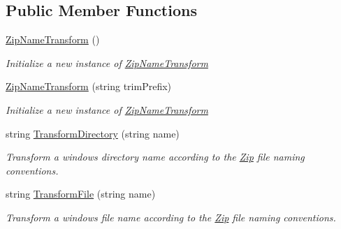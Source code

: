 \subsection*{Public Member Functions}
\begin{DoxyCompactItemize}
\item 
\hyperlink{class_i_c_sharp_code_1_1_sharp_zip_lib_1_1_zip_1_1_zip_name_transform_afa0dd0f6d624a02f5921112095c54349}{Zip\+Name\+Transform} ()
\begin{DoxyCompactList}\small\item\em Initialize a new instance of \hyperlink{class_i_c_sharp_code_1_1_sharp_zip_lib_1_1_zip_1_1_zip_name_transform}{Zip\+Name\+Transform} \end{DoxyCompactList}\item 
\hyperlink{class_i_c_sharp_code_1_1_sharp_zip_lib_1_1_zip_1_1_zip_name_transform_a31a8cb86bd117d63534efbad7a79b0f3}{Zip\+Name\+Transform} (string trim\+Prefix)
\begin{DoxyCompactList}\small\item\em Initialize a new instance of \hyperlink{class_i_c_sharp_code_1_1_sharp_zip_lib_1_1_zip_1_1_zip_name_transform}{Zip\+Name\+Transform} \end{DoxyCompactList}\item 
string \hyperlink{class_i_c_sharp_code_1_1_sharp_zip_lib_1_1_zip_1_1_zip_name_transform_ac5ce9344a3eed6817a8e8a67e9d12bfe}{Transform\+Directory} (string name)
\begin{DoxyCompactList}\small\item\em Transform a windows directory name according to the \hyperlink{namespace_i_c_sharp_code_1_1_sharp_zip_lib_1_1_zip}{Zip} file naming conventions. \end{DoxyCompactList}\item 
string \hyperlink{class_i_c_sharp_code_1_1_sharp_zip_lib_1_1_zip_1_1_zip_name_transform_ad6797c96c6254d7563405a20f4f7ef13}{Transform\+File} (string name)
\begin{DoxyCompactList}\small\item\em Transform a windows file name according to the \hyperlink{namespace_i_c_sharp_code_1_1_sharp_zip_lib_1_1_zip}{Zip} file naming conventions. \end{DoxyCompactList}\end{DoxyCompactItemize}
